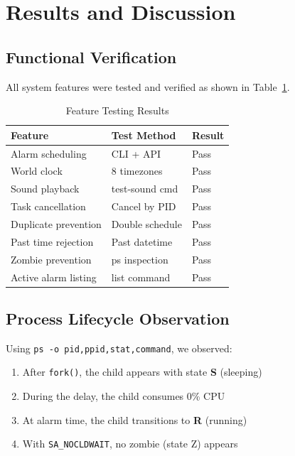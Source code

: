 \documentclass[conference]{IEEEtran}
\begin{document}
\section{Results and Discussion}

\subsection{Functional Verification}

All system features were tested and verified as shown in Table~\ref{tab:results}.

\begin{table}[h]
\centering
\caption{Feature Testing Results}
\label{tab:results}
\begin{tabular}{lll}
\toprule
\textbf{Feature} & \textbf{Test Method} & \textbf{Result} \\
\midrule
Alarm scheduling & CLI + API & Pass \\
World clock & 8 timezones & Pass \\
Sound playback & test-sound cmd & Pass \\
Task cancellation & Cancel by PID & Pass \\
Duplicate prevention & Double schedule & Pass \\
Past time rejection & Past datetime & Pass \\
Zombie prevention & ps inspection & Pass \\
Active alarm listing & list command & Pass \\
\bottomrule
\end{tabular}
\end{table}

\subsection{Process Lifecycle Observation}

Using \texttt{ps -o pid,ppid,stat,command}, we observed:
\begin{enumerate}
    \item After \texttt{fork()}, the child appears with state \textbf{S} (sleeping)
    \item During the delay, the child consumes 0\% CPU
    \item At alarm time, the child transitions to \textbf{R} (running)
    \item With \texttt{SA\_NOCLDWAIT}, no zombie (state Z) appears
\end{enumerate}
\end{document}
